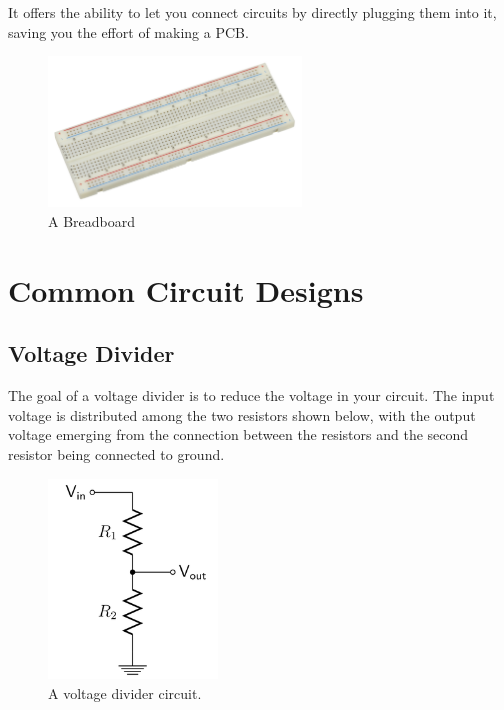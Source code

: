 \documentclass{article}
\begin{document}
It offers the ability to let you connect circuits by directly plugging them into it, saving you the effort of making a PCB.

\begin{figure} [h]
    \centering
    \includegraphics[width=0.6\textwidth]{img/Electronics-White-Breadboard.jpg}
    \caption{A Breadboard}
    \label{fig:breadboard}
\end{figure}

\pagebreak

\section{Common Circuit Designs}

\subsection{Voltage Divider}
The goal of a voltage divider is to reduce the voltage in your circuit. The input voltage is distributed among the two resistors shown below, with the output voltage emerging from the connection between the resistors and the second resistor being connected to ground.

\begin{figure}[h]
    \centering
    \includegraphics[width=0.4\textwidth]{img/Voltage_Div.png}
    \caption{A voltage divider circuit.}
    \label{fig:VoltageDiv}
\end{figure}
\end{document}
